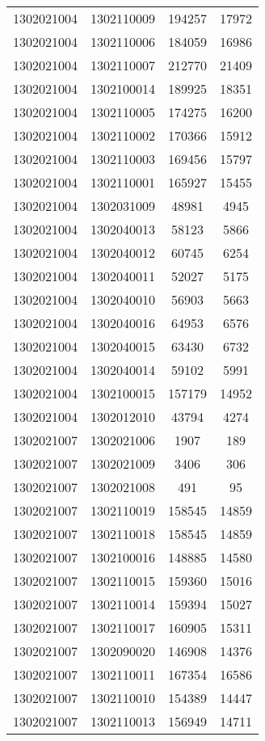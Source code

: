 \begin{longtable}[h]{llcc}
		1302021004 & 1302110009 & 194257 & 17972\\
		1302021004 & 1302110006 & 184059 & 16986\\
		1302021004 & 1302110007 & 212770 & 21409\\
		1302021004 & 1302100014 & 189925 & 18351\\
		1302021004 & 1302110005 & 174275 & 16200\\
		1302021004 & 1302110002 & 170366 & 15912\\
		1302021004 & 1302110003 & 169456 & 15797\\
		1302021004 & 1302110001 & 165927 & 15455\\
		1302021004 & 1302031009 & 48981 & 4945\\
		1302021004 & 1302040013 & 58123 & 5866\\
		1302021004 & 1302040012 & 60745 & 6254\\
		1302021004 & 1302040011 & 52027 & 5175\\
		1302021004 & 1302040010 & 56903 & 5663\\
		1302021004 & 1302040016 & 64953 & 6576\\
		1302021004 & 1302040015 & 63430 & 6732\\
		1302021004 & 1302040014 & 59102 & 5991\\
		1302021004 & 1302100015 & 157179 & 14952\\
		1302021004 & 1302012010 & 43794 & 4274\\
		1302021007 & 1302021006 & 1907 & 189\\
		1302021007 & 1302021009 & 3406 & 306\\
		1302021007 & 1302021008 & 491 & 95\\
		1302021007 & 1302110019 & 158545 & 14859\\
		1302021007 & 1302110018 & 158545 & 14859\\
		1302021007 & 1302100016 & 148885 & 14580\\
		1302021007 & 1302110015 & 159360 & 15016\\
		1302021007 & 1302110014 & 159394 & 15027\\
		1302021007 & 1302110017 & 160905 & 15311\\
		1302021007 & 1302090020 & 146908 & 14376\\
		1302021007 & 1302110011 & 167354 & 16586\\
		1302021007 & 1302110010 & 154389 & 14447\\
		1302021007 & 1302110013 & 156949 & 14711\\

\end{longtable}
